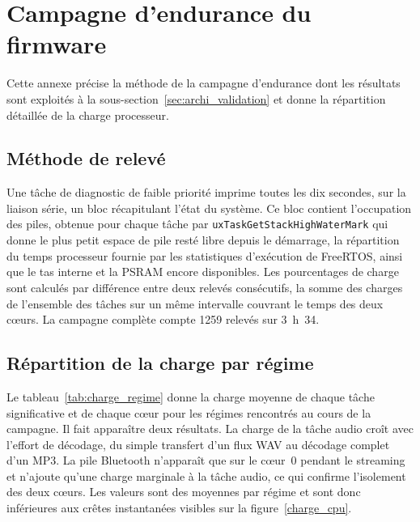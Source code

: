 \chapter{Campagne d'endurance du firmware}
\label{ann:endurance}

Cette annexe précise la méthode de la campagne d'endurance dont les résultats sont exploités à la sous-section~\ref{sec:archi_validation} et donne la répartition détaillée de la charge processeur.

\section*{Méthode de relevé}

Une tâche de diagnostic de faible priorité imprime toutes les dix secondes, sur la liaison série, un bloc récapitulant l'état du système. Ce bloc contient l'occupation des piles, obtenue pour chaque tâche par \texttt{uxTaskGetStackHighWaterMark} qui donne le plus petit espace de pile resté libre depuis le démarrage, la répartition du temps processeur fournie par les statistiques d'exécution de FreeRTOS, ainsi que le tas interne et la PSRAM encore disponibles. Les pourcentages de charge sont calculés par différence entre deux relevés consécutifs, la somme des charges de l'ensemble des tâches sur un même intervalle couvrant le temps des deux cœurs. La campagne complète compte 1259 relevés sur 3~h~34.
\section*{Répartition de la charge par régime}

Le tableau~\ref{tab:charge_regime} donne la charge moyenne de chaque tâche significative et de chaque cœur pour les régimes rencontrés au cours de la campagne. Il fait apparaître deux résultats. La charge de la tâche audio croît avec l'effort de décodage, du simple transfert d'un flux WAV au décodage complet d'un MP3. La pile Bluetooth n'apparaît que sur le cœur~0 pendant le streaming et n'ajoute qu'une charge marginale à la tâche audio, ce qui confirme l'isolement des deux cœurs. Les valeurs sont des moyennes par régime et sont donc inférieures aux crêtes instantanées visibles sur la figure~\ref{charge_cpu}.

